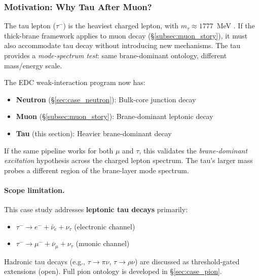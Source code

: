 \subsubsection{Motivation: Why Tau After Muon?}

\begin{tcolorbox}[edcCornerstone, title=\textbf{Cornerstone: Tau as Mode-Spectrum Test}]
The tau lepton ($\tau^-$) is the heaviest charged lepton, with
$m_\tau \approx 1777$~MeV \tagBL{}. If the thick-brane
framework applies to muon decay (\S\ref{subsec:muon_story}), it must also accommodate
tau decay without introducing new mechanisms. The tau provides a
\emph{mode-spectrum test}: same brane-dominant ontology, different
mass/energy scale.
\end{tcolorbox}

The EDC weak-interaction program now has:
\begin{itemize}[nosep]
    \item \textbf{Neutron} (\S\ref{sec:case_neutron}): Bulk-core junction decay
    \item \textbf{Muon} (\S\ref{subsec:muon_story}): Brane-dominant leptonic decay
    \item \textbf{Tau} (this section): Heavier brane-dominant decay
\end{itemize}

If the same pipeline works for both $\mu$ and $\tau$, this validates the
\emph{brane-dominant excitation} hypothesis across the charged lepton
spectrum. The tau's larger mass probes a different region of the
brane-layer mode spectrum.

\paragraph{Scope limitation.}
This case study addresses \textbf{leptonic tau decays} primarily:
\begin{itemize}[nosep]
    \item $\tau^- \to e^- + \bar{\nu}_e + \nu_\tau$ \quad (electronic channel)
    \item $\tau^- \to \mu^- + \bar{\nu}_\mu + \nu_\tau$ \quad (muonic channel)
\end{itemize}
Hadronic tau decays (e.g., $\tau \to \pi\nu$, $\tau \to \rho\nu$) are
discussed as threshold-gated extensions (open). Full pion ontology is developed
in \S\ref{sec:case_pion}.


